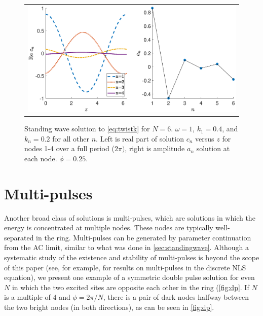\documentclass[12pt,reqno]{amsart}
\begin{document}
\begin{figure}[H]
\begin{center}
\begin{tabular}{c}
\includegraphics[width=15cm]{images/even6assym.eps}
\end{tabular}
\end{center}
\caption{Standing wave solution to \cref{eq:twistk} for $N = 6$. $\omega = 1$, $k_1 = 0.4$, and $k_n = 0.2$ for all other $n$. Left is real part of solution $c_n$ versus $z$ for nodes 1-4 over a full period ($2 \pi)$, right is amplitude $a_n$ solution at each node. $\phi = 0.25$.}
\label{fig:even6assym}
\end{figure}

\section{Multi-pulses}

Another broad class of solutions is multi-pulses, which are solutions in which the energy is concentrated at multiple nodes. These nodes are typically well-separated in the ring. Multi-pulses can be generated by parameter continuation from the AC limit, similar to what was done in \cref{sec:standingwave}. Although a systematic study of the existence and stability of multi-pulses is beyond the scope of this paper (see, for example, \cite{Parker2020} for results on multi-pulses in the discrete NLS equation), we present one example of a symmetric double pulse solution for even $N$ in which the two excited sites are opposite each other in the ring (\cref{fig:dp}. If $N$ is a multiple of 4 and $\phi = 2\pi/N$, there is a pair of dark nodes halfway between the two bright nodes (in both directions), as can be seen in \cref{fig:dp}.
\end{document}
